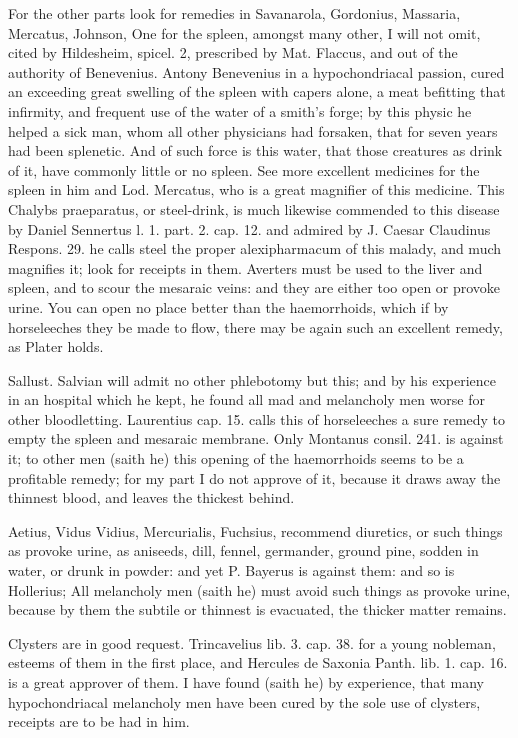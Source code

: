 For the other parts look for remedies in Savanarola, Gordonius,
Massaria, Mercatus, Johnson, \etc{} One for the spleen, amongst many
other, I will not omit, cited by Hildesheim, spicel. 2, prescribed by
Mat. Flaccus, and out of the authority of Benevenius. Antony Benevenius
in a hypochondriacal passion, cured an exceeding great swelling
of the spleen with capers alone, a meat befitting that infirmity, and
frequent use of the water of a smith's forge; by this physic he helped
a sick man, whom all other physicians had forsaken, that for seven
years had been splenetic. And of such force is this water, that
those creatures as drink of it, have commonly little or no spleen. See
more excellent medicines for the spleen in him and Lod. Mercatus,
who is a great magnifier of this medicine. This Chalybs praeparatus, or
steel-drink, is much likewise commended to this disease by Daniel
Sennertus l. 1. part. 2. cap. 12. and admired by J. Caesar Claudinus
Respons. 29. he calls steel the proper alexipharmacum of this
malady, and much magnifies it; look for receipts in them. Averters must
be used to the liver and spleen, and to scour the mesaraic veins: and
they are either too open or provoke urine. You can open no place better
than the haemorrhoids, which if by horseleeches they be made to flow,
there may be again such an excellent remedy, as Plater holds.

Sallust. Salvian will admit no other phlebotomy but this; and by his
experience in an hospital which he kept, he found all mad and
melancholy men worse for other bloodletting. Laurentius cap. 15. calls
this of horseleeches a sure remedy to empty the spleen and mesaraic
membrane. Only Montanus consil. 241. is against it;  to other men
(saith he) this opening of the haemorrhoids seems to be a profitable
remedy; for my part I do not approve of it, because it draws away the
thinnest blood, and leaves the thickest behind.

Aetius, Vidus Vidius, Mercurialis, Fuchsius, recommend diuretics, or
such things as provoke urine, as aniseeds, dill, fennel, germander,
ground pine, sodden in water, or drunk in powder: and yet P.
Bayerus is against them: and so is Hollerius; All melancholy men (saith
he) must avoid such things as provoke urine, because by them the
subtile or thinnest is evacuated, the thicker matter remains.

Clysters are in good request. Trincavelius lib. 3. cap. 38. for a young
nobleman, esteems of them in the first place, and Hercules de Saxonia
Panth. lib. 1. cap. 16. is a great approver of them. I have found
(saith he) by experience, that many hypochondriacal melancholy men have
been cured by the sole use of clysters, receipts are to be had in him.

